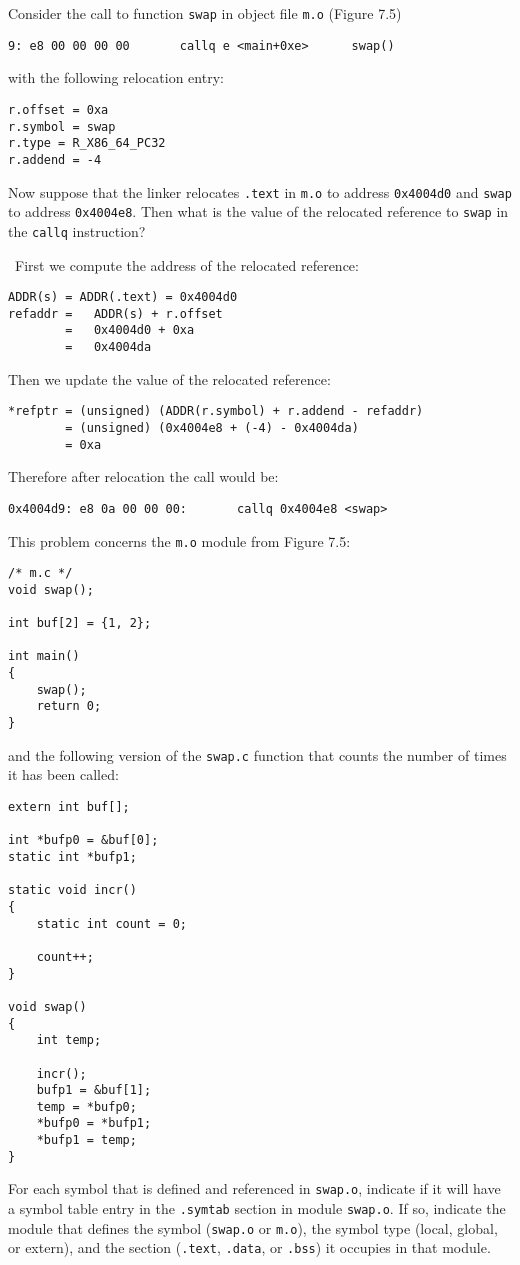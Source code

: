 \documentclass[12pt]{article}
\newenvironment{ex}[2][Exercise]{\begin{trivlist}
		\item[\hskip \labelsep {\bfseries #1}\hskip \labelsep {\bfseries #2.}]}{\end{trivlist}}
\newenvironment{sol}[1][Solution]{\begin{trivlist}
		\item[\hskip \labelsep {\bfseries #1:}]}{\end{trivlist}}
\begin{document}
\begin{ex}{7.5}
	Consider the call to function \texttt{swap} in object file \texttt{m.o} (Figure 7.5)
	\begin{lstlisting}[language={}]
9: e8 00 00 00 00		callq e <main+0xe>		swap()
	\end{lstlisting}
	with the following relocation entry:
	\begin{lstlisting}[language={}]
r.offset = 0xa
r.symbol = swap
r.type = R_X86_64_PC32
r.addend = -4
	\end{lstlisting}
	Now suppose that the linker relocates \texttt{.text} in \texttt{m.o} to address \texttt{0x4004d0} and
	\texttt{swap} to address \texttt{0x4004e8}. Then what is the value of the relocated reference to
	\texttt{swap} in the \texttt{callq} instruction?
\end{ex}

\begin{sol}
	\
	First we compute the address of the relocated reference:
	\begin{lstlisting}[language={}]
ADDR(s) = ADDR(.text) = 0x4004d0
refaddr =	ADDR(s) + r.offset
		=	0x4004d0 + 0xa
		=	0x4004da	
	\end{lstlisting}
	Then we update the value of the relocated reference:
	\begin{lstlisting}[language={}]
*refptr = (unsigned) (ADDR(r.symbol) + r.addend - refaddr)
		= (unsigned) (0x4004e8 + (-4) - 0x4004da)
		= 0xa
	\end{lstlisting}
	Therefore after relocation the call would be:
	\begin{lstlisting}[language={}]
0x4004d9: e8 0a 00 00 00:		callq 0x4004e8 <swap>
	\end{lstlisting}
\end{sol}

\begin{ex}{7.6}
	This problem concerns the \texttt{m.o} module from Figure 7.5:
	\begin{lstlisting}
/* m.c */
void swap();

int buf[2] = {1, 2};

int main()
{
	swap();
	return 0;
}
	\end{lstlisting}
	and the following version of the \texttt{swap.c} function that counts the number of times it has been
	called:
	\begin{lstlisting}
extern int buf[];

int *bufp0 = &buf[0];
static int *bufp1;

static void incr()
{
	static int count = 0;
	
	count++;
}

void swap()
{
	int temp;
	
	incr();
	bufp1 = &buf[1];
	temp = *bufp0;
	*bufp0 = *bufp1;
	*bufp1 = temp;
}
	\end{lstlisting}
	For each symbol that is defined and referenced in \texttt{swap.o}, indicate if it will have a symbol
	table entry in the \texttt{.symtab} section in module \texttt{swap.o}. If so, indicate the module that
	defines the symbol (\texttt{swap.o} or \texttt{m.o}), the symbol type (local, global, or extern),
	and the section (\texttt{.text}, \texttt{.data}, or \texttt{.bss}) it occupies in that module.
\end{ex}
\end{document}
